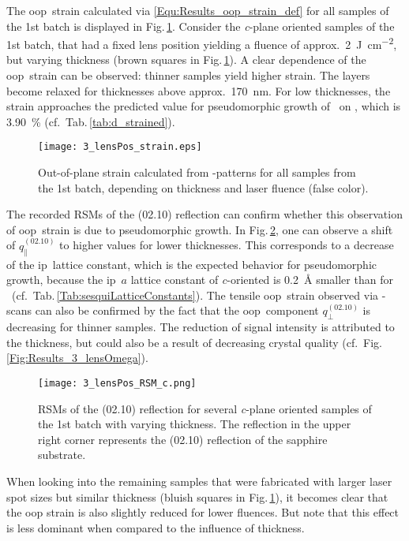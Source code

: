 The \gls{oop}\ strain calculated via \eqref{Equ:Results_oop_strain_def} for all samples of the 1st batch is displayed in Fig.\,\ref{Fig:Results_3_lensStrain}.
Consider the \textit{c}-plane oriented samples of the 1st batch, that had a fixed lens position yielding a fluence of approx.\ \qty{2}{\joule\per\cm\squared}, but varying thickness (brown squares in Fig.\,\ref{Fig:Results_3_lensStrain}).
A clear dependence of the \gls{oop}\ strain can be observed: thinner samples yield higher strain.
The layers become relaxed for thicknesses above approx.\ \qty{170}{\nm}.
For low thicknesses, the strain approaches the predicted value for pseudomorphic growth of \cro\ on , which is \qty{3.90}{\percent} (cf.\ Tab.\,\ref{tab:d_strained}).
\begin{figure}
    \centering
    \texttt{[image: 3\_lensPos\_strain.eps]}
    \caption{
        Out-of-plane strain calculated from \thetaomega-patterns for all samples from the 1st batch, depending on thickness and laser fluence (false color).
    }
    \label{Fig:Results_3_lensStrain}
\end{figure}
The recorded \glspl{RSM} of the (02.10) reflection can confirm whether this observation of \gls{oop}\ strain is due to pseudomorphic growth.
In Fig.\,\ref{Fig:Results_3_cRSMs}, one can observe a shift of $q_\parallel^{(02.10)}$ to higher values for lower thicknesses.
This corresponds to a decrease of the \gls{ip}\ lattice constant, which is the expected behavior for pseudomorphic growth, because the \gls{ip}\ $a$ lattice constant of \textit{c}-oriented  is \qty{0.2}{\angstrom} smaller than for \cro\ (cf.~Tab.\,\ref{Tab:sesquiLatticeConstants}).
The tensile \gls{oop}\ strain observed via \thetaomega-scans can also be confirmed by the fact that the \gls{oop}\ component $q_\perp^{(02.10)}$ is decreasing for thinner samples.
The reduction of signal intensity is attributed to the thickness, but could also be a result of decreasing crystal quality (cf.~Fig.\,\ref{Fig:Results_3_lensOmega}).
\begin{figure}
    \centering
    \texttt{[image: 3\_lensPos\_RSM\_c.png]}
    \caption{
        \glspl{RSM} of the (02.10) reflection for several \textit{c}-plane oriented samples of the 1st batch with varying thickness.
        The reflection in the upper right corner represents the (02.10) reflection of the sapphire substrate.
    }
    \label{Fig:Results_3_cRSMs}
\end{figure}
When looking into the remaining samples that were fabricated with larger laser spot sizes but similar thickness (bluish squares in Fig.\,\ref{Fig:Results_3_lensStrain}), it becomes clear that the \gls{oop} strain is also slightly reduced for lower fluences.
But note that this effect is less dominant when compared to the influence of thickness.

